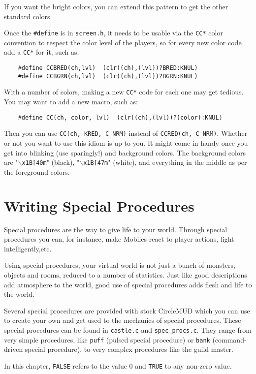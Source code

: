 \documentclass[11pt]{article}
\begin{document}
If you want the bright colors, you can extend this pattern to get the other standard colors.
\par
Once the \texttt{\#define} is in \texttt{screen.h}, it needs to be usable via the \texttt{CC*} color convention to respect the color level of the players, so for every new color code add a \texttt{CC*} for it, such as:
\begin{verbatim}
	#define CCBRED(ch,lvl)  (clr((ch),(lvl))?BRED:KNUL)
	#define CCBGRN(ch,lvl)  (clr((ch),(lvl))?BGRN:KNUL)
\end{verbatim}
With a number of colors, making a new \texttt{CC*} code for each one may get tedious.  You may want to add a new macro, such as:
\begin{verbatim}
	#define CC(ch, color, lvl)	(clr((ch),(lvl))?(color):KNUL)
\end{verbatim}
Then you can use \texttt{CC(ch, KRED, C\_NRM)} instead of \texttt{CCRED(ch, C\_NRM)}.  Whether or not you want to use this idiom is up to you.  It might come in handy once you get into blinking (use sparingly!) and background colors.  The background colors are "\texttt{$\backslash$x1B[40m}" (black), "\texttt{$\backslash$x1B[47m}" (white), and everything in the middle as per the foreground colors.

\section{Writing Special Procedures}
Special procedures are the way to give life to your world. Through special procedures you can, for instance, make Mobiles react to player actions, fight intelligently,etc.
\par
Using special procedures, your virtual world is not just a bunch of monsters, objects and rooms, reduced to a number of statistics.  Just like good descriptions add atmosphere to the world, good use of special procedures adds flesh and life to the world.
\par
Several special procedures are provided with stock CircleMUD which you can use to create your own and get used to the mechanics of special procedures.  These special procedures can be found in \texttt{castle.c} and \texttt{spec\_procs.c}.  They range from very simple procedures, like \texttt{puff} (pulsed special procedure) or \texttt{bank} (command-driven special procedure), to very complex procedures like the guild master.
\par
In this chapter, \texttt{FALSE} refers to the value 0 and \texttt{TRUE} to any non-zero value.
\end{document}
